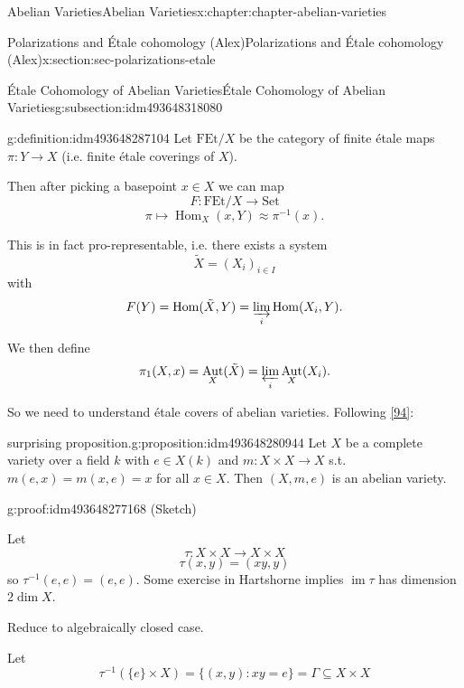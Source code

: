 \documentclass[oneside,10pt,]{book}
\numberwithin{equation}{section}
\DeclareMathOperator{\Hom}{Hom}
\DeclareMathOperator{\im}{im}
\DeclareMathOperator{\Aut}{Aut}
\begin{document}
\begin{chapterptx}{Abelian Varieties}{}{Abelian Varieties}{}{}{x:chapter:chapter-abelian-varieties}
\begin{sectionptx}{Polarizations and Étale cohomology (Alex)}{}{Polarizations and Étale cohomology (Alex)}{}{}{x:section:sec-polarizations-etale}
\begin{subsectionptx}{Étale Cohomology of Abelian Varieties}{}{Étale Cohomology of Abelian Varieties}{}{}{g:subsection:idm493648318080}
\begin{definition}{}{g:definition:idm493648287104}%
Let \(\mathrm{FEt}/X\) be the category of finite étale maps \(\pi\colon Y \to X\) (i.e. finite étale coverings of \(X\)).%
\par
Then after picking a basepoint \(x\in X\) we can map%
\begin{equation*}
F\colon \mathrm{FEt}/X\to \mathrm{Set}
\end{equation*}
%
\begin{equation*}
\pi\mapsto \Hom_X(x,Y) \approx\pi^{-1}(x)\text{.}
\end{equation*}
%
\par
This is in fact pro-representable, i.e. there exists a system%
\begin{equation*}
\tilde X = (X_i)_{i\in I}
\end{equation*}
with%
\begin{equation*}
F(Y) = \Hom(\tilde X ,Y) = \varinjlim_i \Hom(X_i, Y)\text{.}
\end{equation*}
%
\par
We then define%
\begin{equation*}
\pi_1(X,x) = \Aut_X(\tilde X) = \varprojlim_i \Aut_X(X_i)\text{.}
\end{equation*}
%
\end{definition}
So we need to understand étale covers of abelian varieties. Following \hyperlink{x:biblio:bib-vandergeer-moonen}{[94]}:%
\begin{proposition}{surprising proposition.}{}{g:proposition:idm493648280944}%
Let \(X\)  be a complete variety over a field \(k\) with \(e\in X(k)\) and \(m \colon X\times X\to X\) s.t. \(m(e,x) = m(x,e) = x\) for all \(x \in X\). Then \((X, m,e)\) is an abelian variety.%
\end{proposition}
\begin{proofptx}{}{g:proof:idm493648277168}
(Sketch)%
\par
Let%
\begin{equation*}
\tau\colon X\times X \to X\times X
\end{equation*}
%
\begin{equation*}
\tau(x,y) = (xy,y)
\end{equation*}
so \(\tau^{-1} (e,e) = (e,e)\). Some exercise in Hartshorne implies \(\im \tau\) has dimension \(2\dim X\).%
\par
Reduce to algebraically closed case.%
\par
Let%
\begin{equation*}
\tau^{-1}(\{e\} \times X) =  \{(x,y) : xy = e\} = \Gamma \subseteq X\times X

\end{equation*}
\end{proofptx}
\end{subsectionptx}
\end{sectionptx}
\end{chapterptx}
\end{document}
